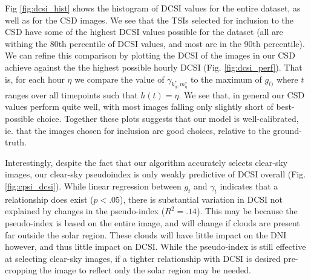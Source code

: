 \documentclass{article}
\begin{document}
Fig \ref{fig:dcsi_hist} shows the histogram of DCSI values for the entire dataset, as well as for the CSD images. We see that the TSIs selected for inclusion to the CSD have some of the highest DCSI values possible for the dataset (all are withing the 80th percentile of DCSI values, and most are in the 90th percentile). We can refine this comparison by plotting the DCSI of the images in our CSD achieve against the the highest possible hourly DCSI (Fig. \ref{fig:dcsi_perf}). That is, for each hour $\eta$ we compare the value of $\gamma_{k_{\eta}^*,m_{\eta}^*}$ to the maximum of $g_{t)}$ where $t$ ranges over all timepoints such that $h(t) = \eta$. We see that, in general our CSD values perform quite well, with most images falling only slightly short of best-possible choice. Together these plots suggests that our model is well-calibrated, ie. that the images chosen for inclusion are good choices, relative to the ground-truth.

Interestingly, despite the fact that our algorithm accurately selects clear-sky images, our clear-sky pseudoindex is only weakly predictive of DCSI overall (Fig. \ref{fig:cpsi_dcsi}). While linear regression between $g_t$ and $\gamma_t$ indicates that a relationship does exist ($p<.05$), there is substantial variation in DCSI not explained by changes in the pseudo-index ($R^2=.14$). This may be because the pseudo-index is based on the entire image, and will change if clouds are present far outside the solar region. These clouds will have little impact on the DNI however, and thus little impact on DCSI. While the pseudo-index is still effective at selecting clear-sky images, if a tighter relationship with DCSI is desired pre-cropping the image to reflect only the solar region may be needed.
\end{document}
